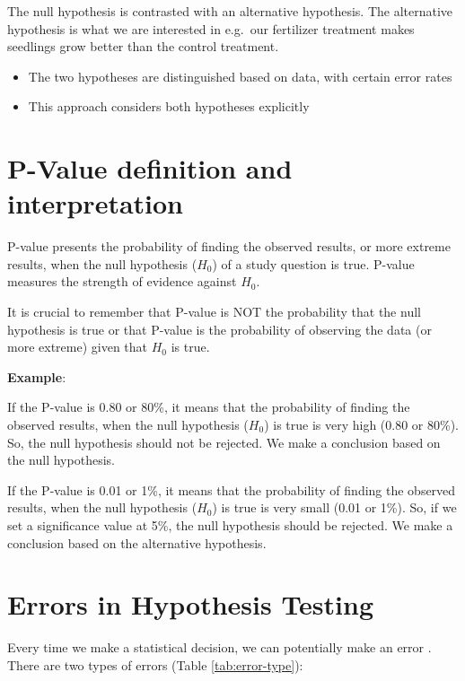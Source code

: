 \documentclass[
]{book}
\providecommand{\tightlist}{%
  \setlength{\itemsep}{0pt}\setlength{\parskip}{0pt}}
\begin{document}
The null hypothesis is contrasted with an alternative hypothesis. The alternative hypothesis is what we are interested in e.g.~our fertilizer treatment makes seedlings grow better than the control treatment.

\begin{itemize}
\tightlist
\item
  The two hypotheses are distinguished based on data, with certain error rates
\item
  This approach considers both hypotheses explicitly
\end{itemize}

\section{P-Value definition and interpretation}\label{p-value-definition-and-interpretation}

P-value presents the probability of finding the observed results, or more extreme results, when the null hypothesis (\(H_0\)) of a study question is true. P-value measures the strength of evidence against \(H_0\).

It is crucial to remember that P-value is NOT the probability that the null hypothesis is true or that P-value is the probability of observing the data (or more extreme) given that \(H_0\) is true.

\textbf{Example}:

If the P-value is 0.80 or 80\%, it means that the probability of finding the observed results, when the null hypothesis (\(H_0\)) is true is very high (0.80 or 80\%). So, the null hypothesis should not be rejected. We make a conclusion based on the null hypothesis.

If the P-value is 0.01 or 1\%, it means that the probability of finding the observed results, when the null hypothesis (\(H_0\)) is true is very small (0.01 or 1\%). So, if we set a significance value at 5\%, the null hypothesis should be rejected. We make a conclusion based on the alternative hypothesis.

\section{Errors in Hypothesis Testing}\label{errors-in-hypothesis-testing}

Every time we make a statistical decision, we can potentially make an error \citep{navarro2023}. There are two types of errors (Table \ref{tab:error-type}):
\end{document}
